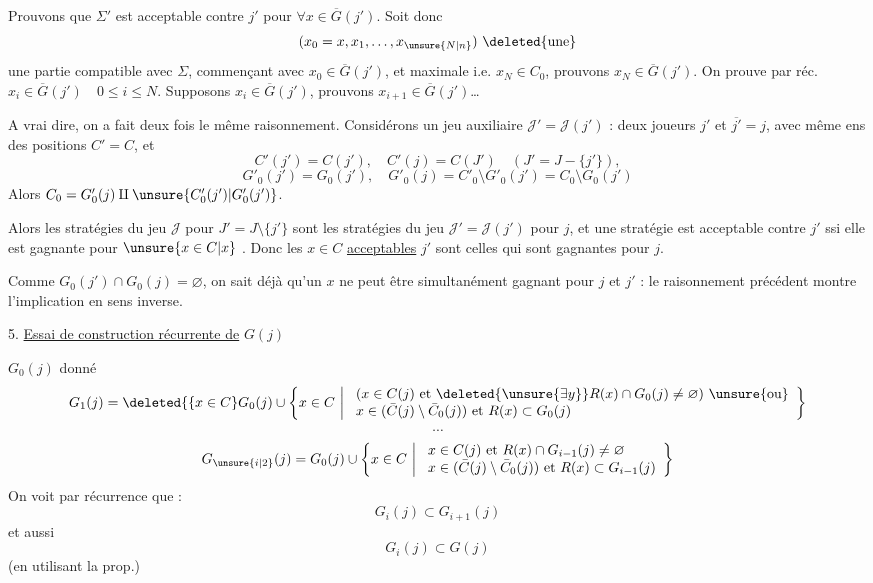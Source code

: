 Prouvons que $\Sigma'$ est acceptable contre $j'$ pour $\forall x\in\overline G(j')$. Soit donc
\[
(x_0=x,x_1,\ldots,x_{\unsure{N|n}})\ \deleted{\text{une}}
\]
une partie compatible avec $\Sigma$, commençant avec $x_0\in\overline G(j')$, et maximale i.e. $x_N\in C_0$, prouvons $x_N\in\overline G(j')$. On  prouve par réc. $x_i\in\overline G(j')\quad0\leq i\leq N$.
Supposons $x_i\in\overline G(j')$,  prouvons $x_{i+1}\in\overline G(j')$\ldots

A vrai dire, on a fait deux fois le même raisonnement. Considérons un jeu auxiliaire $\mathcal J'=\mathcal J(j')$ : deux joueurs $j'$ et $\overline{j'}=j$, avec même ens des  positions $C'=C$,  et
\[
C'(j')=C(j'),\quad C'(j)=C(J')\quad(J'=J-\{j'\}),
\]
\[
G'_0(j')=G_0(j'),\quad G'_0(j)=C'_0\setminus G'_0(j')=C_0\setminus G_0(j')
\]
Alors $C_0=G'_0(j)\amalg\unsure{C'_0(j')|G'_0(j')}$.

Alors les stratégies du jeu $\mathcal J$ pour $J'=J\setminus\{j'\}$ sont les stratégies du jeu $\mathcal J'=\mathcal J(j')$ pour $j$, et une stratégie  est acceptable  contre $j'$ ssi elle est gagnante pour $\unsure{x\in C|x}$ .
Donc les  $x\in C$ \uline{acceptables}  $j'$ sont celles qui sont gagnantes pour $j$.

Comme $G_0(j')\cap G_0(j)=\varnothing$, on sait déjà qu'un $x$ ne peut être simultanément gagnant pour $j$ et $j'$ :  le raisonnement précédent montre  l'implication en sens inverse.

5. \uline{Essai de construction récurrente de} $G(j)$

$G_0(j)$ donné
\[
G_1(j)=\deleted{\{x\in C}G_0(j)\cup
\left\{x\in C\ \middle|\ 
\begin{array}{l}
(x\in C(j)\text{ et }\deleted{\unsure{\exists y}}R(x)\cap G_0(j)\ne\varnothing)\ \unsure{\text{ou}}\\
x\in(\bar C(j)\setminus\bar C_0(j))\text{ et }R(x)\subset G_0(j)
\end{array}\right\}
\]
\[
\cdots
\]
\[
G_{\unsure{i|2}}(j)=G_0(j)\cup
\left\{x\in C\ \middle|\ 
\begin{array}{l}
x\in C(j)\text{ et }R(x)\cap G_{i-1}(j)\ne\varnothing\\
x\in(\bar C(j)\setminus\bar C_0(j))\text{ et }R(x)\subset G_{i-1}(j)
\end{array}\right\}
\]
On voit par récurrence que :
\[
G_i(j)\subset G_{i+1}(j)
\]
et aussi
\[
G_i(j)\subset G(j)
\]
(en utilisant la prop.)

